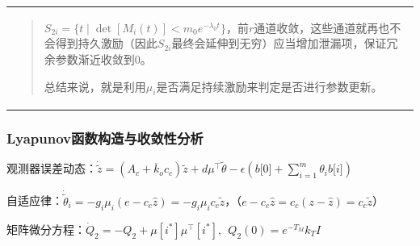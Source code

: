 \documentclass[
  12pt,
  a4paper
]{article}
\begin{document}
\begin{longtable}[]{@{}
  >{\raggedright\arraybackslash}p{}@{}}
\begin{minipage}[t]{\linewidth}
\begin{quote}
\(S_{2i} = \{ t \mid \det\left\lbrack M_{i}(t) \right\rbrack < m_{0}e^{- \lambda_{0}t}\}\)，前\(r\)通道收敛，这些通道就再也不会得到持久激励（因此\(S_{2i}\)最终会延伸到无穷）应当增加泄漏项，保证冗余参数渐近收敛到0。

总结来说，就是利用\(\mu_{i}\)是否满足持续激励来判定是否进行参数更新。
\end{quote}
\end{minipage} \\
\end{longtable}

\subsubsection{Lyapunov函数构造与收敛性分析}\label{lyapunovux51fdux6570ux6784ux9020ux4e0eux6536ux655bux6027ux5206ux6790}

观测器误差动态：\(\dot{\widetilde{z}} = \left( A_{c} + {\overline{k}}_{o}c_{c} \right)\widetilde{z} + d\mu^{\top}\widetilde{\theta} - \epsilon\left( b\lbrack 0\rbrack + \sum_{i = 1}^{m}\theta_{i}b\lbrack i\rbrack \right)\)

自适应律：\({\dot{\widetilde{\theta}}}_{i} = - g_{i}\mu_{i}\left( e - c_{c}\widehat{z} \right) = - g_{i}\mu_{i}c_{c}\widetilde{z}\)，（\(e - c_{c}\widehat{z} = c_{c}\left( z - \widehat{z} \right) = c_{c}\widetilde{z}\)）

矩阵微分方程：\({\dot{Q}}_{2} = - Q_{2} + \mu\left\lbrack i^{*} \right\rbrack\mu^{\top}\left\lbrack i^{*} \right\rbrack,\ \ Q_{2}(0) = e^{- T_{M}}k_{T}I\)
\end{document}
